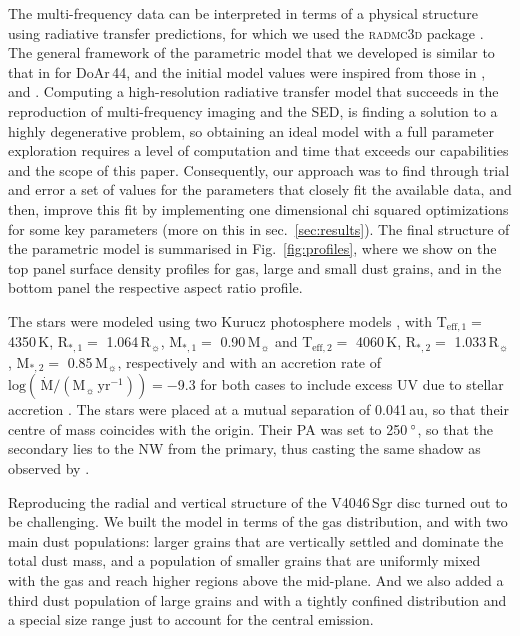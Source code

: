 \documentclass[fleqn,usenatbib,useAMS]{mnras}
\begin{document}
The multi-frequency data can be interpreted in terms of a physical structure using radiative transfer predictions, for which we used the \textsc{radmc3d} package \citep[version 2.0,][]{Dullemond_2012}. The general framework of the parametric model that we developed is similar to that in \citet{2018MNRAS.477.5104C} for DoAr\,44, and the initial model values were inspired from those in \citet{Rosenfeld_2013}, \citet{Ru_z_Rodr_guez_2019} and \citet{2019ApJ...882..160Q}. Computing a high-resolution radiative transfer model that succeeds in the reproduction of multi-frequency imaging and the SED, is finding a solution to a highly degenerative problem, so obtaining an ideal model with a full parameter exploration requires a level of computation and time that exceeds our capabilities and the scope of this paper. Consequently, our approach was to find through trial and error a set of values for the parameters that closely fit the available data, and then, improve this fit by implementing one dimensional chi squared optimizations for some key parameters (more on this in sec.~\ref{sec:results}). The final structure of the parametric model is summarised in Fig.~\ref{fig:profiles}, where we show on the top panel surface density profiles for gas, large and small dust grains, and in the bottom panel the respective aspect ratio profile.

The stars were modeled using two Kurucz photosphere models \citep{1979ApJS...40....1K, 1997A&A...318..841C}, with T$_{\mathrm{eff},1} =$ 4350\,K, R$_{*,1} =$ 1.064\,R$_{\sun}$, M$_{*,1} =$ 0.90\,M$_{\sun}$ and T$_{\mathrm{eff},2} =$ 4060\,K, R$_{*,2} =$ 1.033\,R$_{\sun}$, M$_{*,2} =$ 0.85\,M$_{\sun}$, respectively and with an accretion rate of $\mathrm{log}(\,\dot{\mathrm{M}}/(\mathrm{M}_{\sun}\,\mathrm{yr^{-1}})) = -$9.3 for both cases to include excess UV due to stellar accretion \citep{10.1111/j.1365-2966.2011.19366.x}. The stars were placed at a mutual separation of 0.041\,au, so that their centre of mass coincides with the origin. Their PA was set to 250\,$\hbox{$^\circ$}$, so that the secondary lies to the NW from the primary, thus casting the same shadow as observed by \citet{dOrazi}.

Reproducing the radial and vertical structure of the V4046\,Sgr disc turned out to be challenging. We built the model in terms of the gas distribution, and with two main dust populations: larger grains that are vertically settled and dominate the total dust mass, and a population of smaller grains that are uniformly mixed with the gas and reach higher regions above the mid-plane. And we also added a third dust population of large grains and with a tightly confined distribution and a special size range just to account for the central emission.
\end{document}
